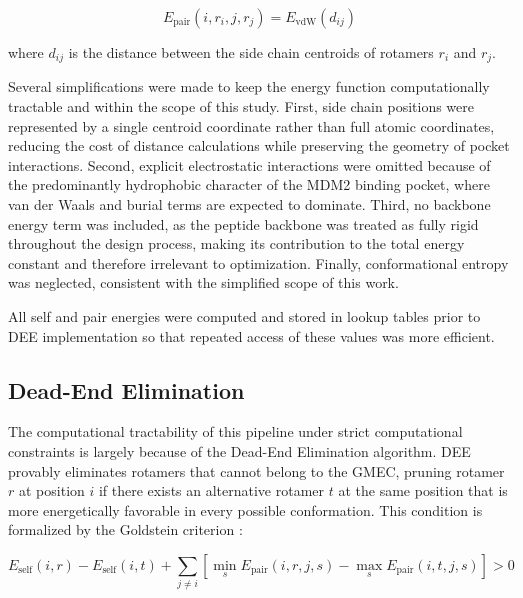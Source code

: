 \begin{equation}
E_{\text{pair}}(i, r_i, j, r_j) = E_{\text{vdW}}(d_{ij})
\label{eq:pair_energy}
\end{equation}

\noindent where $d_{ij}$ is the distance between the side chain centroids of rotamers $r_i$ and $r_j$.

Several simplifications were made to keep the energy function computationally tractable and within the scope of this study. First, side chain positions were represented by a single centroid coordinate rather than full atomic coordinates, reducing the cost of distance calculations while preserving the geometry of pocket interactions. Second, explicit electrostatic interactions were omitted because of the predominantly hydrophobic character of the MDM2 binding pocket, where van der Waals and burial terms are expected to dominate. Third, no backbone energy term was included, as the peptide backbone was treated as fully rigid throughout the design process, making its contribution to the total energy constant and therefore irrelevant to optimization. Finally, conformational entropy was neglected, consistent with the simplified scope of this work.

All self and pair energies were computed and stored in lookup tables prior to DEE implementation so that repeated access of these values was more efficient.

\subsection{Dead-End Elimination}
The computational tractability of this pipeline under strict computational constraints is largely because of the Dead-End Elimination algorithm. DEE provably eliminates rotamers that cannot belong to the GMEC, pruning rotamer $r$ at position $i$ if there exists an alternative rotamer $t$ at the same position that is more energetically favorable in every possible conformation. This condition is formalized by the Goldstein criterion \cite{Dahiyat}:

\begin{equation}
E_{\text{self}}(i, r) - E_{\text{self}}(i, t) + 
\sum_{j \neq i} \left[ \min_{s} E_{\text{pair}}(i, r, j, s) - 
\max_{s} E_{\text{pair}}(i, t, j, s) \right] > 0
\label{eq:DEE}
\end{equation}

